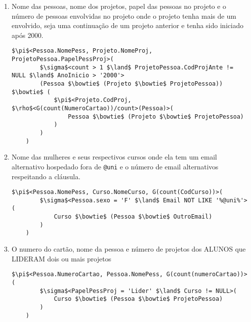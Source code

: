 \documentclass[fleqn]{article}
\begin{document}
\begin{enumerate}[I]
        \item Nome das pessoas, nome dos projetos, papel das pessoas no projeto
        e o número de pessoas envolvidas no projeto onde o projeto tenha mais
        de um envolvido, seja uma continuação de um projeto anterior e tenha
        sido iniciado após 2000.
            \begin{lstlisting}[mathescape]
    $\pi$<Pessoa.NomePess, Projeto.NomeProj, ProjetoPessoa.PapelPessProj>(
        $\sigma$<count > 1 $\land$ ProjetoPessoa.CodProjAnte != NULL $\land$ AnoInicio > '2000'>
        (Pessoa $\bowtie$ (Projeto $\bowtie$ ProjetoPessoa)) $\bowtie$ (    
            $\pi$<Projeto.CodProj, $\rho$<G(count(NumeroCartao))/count>(Pessoa)>(
                Pessoa $\bowtie$ (Projeto $\bowtie$ ProjetoPessoa)
            )
        )
    )
            \end{lstlisting}
        
        \item Nome das mulheres e seus respectivos cursos onde ela tem um email
        alternativo hospedado fora de \texttt{@uni} e o número de email
        alternativos respeitando a cláusula.
            \begin{lstlisting}[mathescape]
    $\pi$<Pessoa.NomePess, Curso.NomeCurso, G(count(CodCurso))>(
        $\sigma$<Pessoa.sexo = 'F' $\land$ Email NOT LIKE '%@uni%'>(
            Curso $\bowtie$ (Pessoa $\bowtie$ OutroEmail)
        )
    )
            \end{lstlisting}
    
    \newpage
        \item O numero do cartão, nome da pessoa e número de projetos dos ALUNOS
        que LIDERAM dois ou mais projetos
            \begin{lstlisting}[mathescape]
    $\pi$<Pessoa.NumeroCartao, Pessoa.NomePess, G(count(numeroCartao))>(
        $\sigma$<PapelPessProj = 'Lider' $\land$ Curso != NULL>(
            Curso $\bowtie$ (Pessoa $\bowtie$ ProjetoPessoa)
        )
    )
            \end{lstlisting}
    \end{enumerate}
\end{document}
